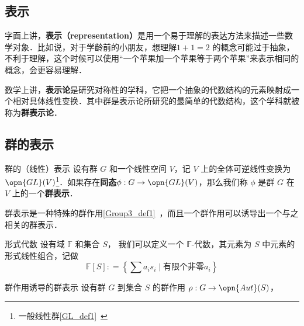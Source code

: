 
\begin{issues}
\end{issues}


\subsection{表示}

字面上讲，\textbf{表示（representation）}是用一个易于理解的表达方法来描述一些数学对象．比如说，对于学龄前的小朋友，想理解$1+1=2$ 的概念可能过于抽象，不利于理解，这个时候可以使用“一个苹果加一个苹果等于两个苹果”来表示相同的概念，会更容易理解．

数学上讲，\textbf{表示论}是研究对称性的学科，它把一个抽象的代数结构的元素映射成一个相对具体线性变换．其中群是表示论所研究的最简单的代数结构，这个学科就被称为\textbf{群表示论}．

\subsection{群的表示}

% 
% 
% 
% 

\begin{definition}{群的（线性）表示}
设有群 $G$ 和一个线性空间 $V$，记 $V$ 上的全体可逆线性变换为 $\opn{GL}(V)$\footnote{一般线性群\autoref{GL_def1}~}．如果存在\textbf{同态}$\phi: G\rightarrow \opn{GL}(V)$，那么我们称 $\phi$ 是群 $G$ 在 $V$ 上的一个\textbf{群表示}．
\end{definition}

群表示是一种特殊的群作用\autoref{Group3_def1}~，而且一个群作用可以诱导出一个与之相关的群表示．

\begin{definition}{形式代数}
设有域 $\mathbb{F}$ 和集合 $S$， 我们可以定义一个 $\mathbb{F}$-代数，其元素为 $S$ 中元素的形式线性组合，记做
$$
\mathbb{F}[S]: = \left\{ \sum a_i s_i \mid \text{有限个非零} a_i \right\}
$$
\end{definition}

\begin{definition}{群作用诱导的群表示}
设有群 $G$ 到集合 $S$ 的群作用 $\rho: G \to \opn{Aut}(S)$，
\end{definition}